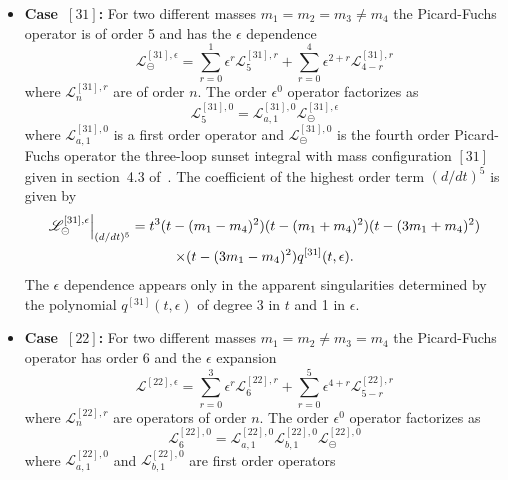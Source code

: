 \documentclass[a4paper,12pt]{article}
\numberwithin{equation}{section}
\numberwithin{figure}{section}
\def\su{\circleddash}
\begin{document}
\begin{itemize}
  \item   {\bf Case~$[31]$:} For two different masses $m_1=m_2=m_3 \neq m_4$ the
  Picard-Fuchs operator is of order 5 and has the $\epsilon$ dependence
  \begin{equation}
    \mathscr{L}^{[31],\epsilon}_\su=       \sum_{r=0}^1 \epsilon^r
    \mathscr{L}^{[31],r}_{5}+  \sum_{r=0}^4 \epsilon^{2+r}   \mathscr{L}^{[31],r}_{4-r}
  \end{equation}
  where  $ \mathscr{L}^{[31],r}_{n}$ are of order $n$.
  The order $\epsilon^0$ operator factorizes as
  \begin{equation}
         \mathscr{L}^{[31],0}_{5}=   \mathscr{L}^{[31],0}_{a,1} \mathscr{L}^{[31],\epsilon}_\su
       \end{equation}
        where  $ \mathscr{L}^{[31],0}_{a,1}$ is a  first order operator
       and $\mathscr{L}^{[31],0}_\su$ is the fourth order
       Picard-Fuchs operator the
       three-loop sunset integral with mass configuration $[31]$ given
       in section~4.3 of~\cite{Lairez:2022zkj}.
       The coefficient of the highest order term $(d/dt)^5$    is given by
       \begin{multline}
                   \mathscr{L}^{[31],\epsilon}_\su\Big\vert_{(d/dt)^5}=
                   t^3  (t-(m_1-m_4)^2)(t-(m_1+m_4)^2)(t-(3m_1+m_4)^2) \cr\times (t-(3m_1-m_4)^2)
            q^{[31]}(t,\epsilon)      .
                 \end{multline}
                 The $\epsilon$ dependence appears only in the
                 apparent singularities determined by the polynomial
                 $q^{[31]}(t,\epsilon)$ of degree 3 in $t$ and 1 in $\epsilon$.
\item   {\bf Case~$[22]$:} For two different masses $m_1=m_2\neq m_3 = m_4$ the
  Picard-Fuchs operator has order 6 and the $\epsilon$ expansion 
  \begin{equation}
    \mathscr{L}^{[22],\epsilon}=     \sum_{r=0}^3 \epsilon^r
    \mathscr{L}^{[22],r}_{6}+  \sum_{r=0}^5 \epsilon^{4+r}   \mathscr{L}^{[22],r}_{5-r}
  \end{equation}
  where  $ \mathscr{L}^{[22],r}_{n}$ are 
  operators of order $n$.
  The order $\epsilon^0$ operator factorizes as
  \begin{equation}
         \mathscr{L}^{[22],0}_{6}=   \mathscr{L}^{[22],0}_{a,1} \mathscr{L}^{[22],0}_{b,1}\mathscr{L}^{[22],0}_\su
       \end{equation}
       where  $ \mathscr{L}^{[22],0}_{a,1}$ and $
       \mathscr{L}^{[22],0}_{b,1}$ are first order operators

\end{itemize}
\end{document}
